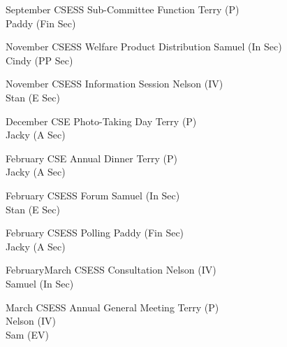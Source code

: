 {\bTR{}
\eTD\bTD September
\eTD{}
\eTD\bTD CSESS Sub-Committee Function
\eTD\bTD Terry (P) \\ Paddy (Fin Sec)
\eTD\eTR

\bTR{}
\eTD\bTD November
\eTD{}
\eTD\bTD CSESS Welfare Product Distribution
\eTD\bTD Samuel (In Sec) \\ Cindy (PP Sec)
\eTD\eTR

\bTR{}
\eTD\bTD November
\eTD{}
\eTD\bTD CSESS Information Session
\eTD\bTD Nelson (IV) \\ Stan (E Sec)
\eTD\eTR

\bTR{}
\eTD\bTD December
\eTD{}
\eTD\bTD CSE Photo-Taking Day
\eTD\bTD Terry (P) \\ Jacky (A Sec)
\eTD\eTR


\bTR{}
\eTD\bTD February
\eTD{}
\eTD\bTD CSE Annual Dinner
\eTD\bTD Terry (P) \\ Jacky (A Sec)
\eTD\eTR

\bTR{}
\eTD\bTD February
\eTD{}
\eTD\bTD CSESS Forum
\eTD\bTD Samuel (In Sec) \\ Stan (E Sec)
\eTD\eTR

\bTR{}
\eTD\bTD February
\eTD{}
\eTD\bTD CSESS Polling
\eTD\bTD Paddy (Fin Sec) \\ Jacky (A Sec)
\eTD\eTR

\bTR{}
\eTD\bTD February\endash March
\eTD{}
\eTD\bTD CSESS Consultation
\eTD\bTD Nelson (IV) \\ Samuel (In Sec)
\eTD\eTR

\bTR{}
\eTD\bTD March
\eTD{}
\eTD\bTD CSESS Annual General Meeting
\eTD\bTD Terry (P) \\ Nelson (IV) \\ Sam (EV)
\eTD\eTR

\eTABLEbody
\eTABLE
}

\pagebreak
